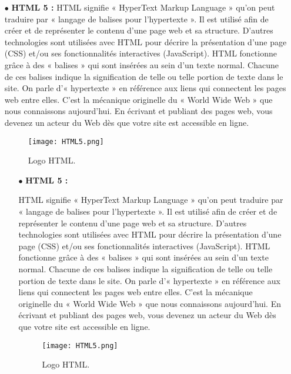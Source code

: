 \begin{itemize}
	\item[$\bullet$] \textbf{HTML 5 :} 	
HTML signifie « HyperText Markup Language » qu’on peut traduire par « langage de
balises pour l’hypertexte ». Il est utilisé afin de créer et de représenter le contenu d’une
page web et sa structure. D’autres technologies sont utilisées avec HTML pour décrire la
présentation d’une page (CSS) et/ou ses fonctionnalités interactives (JavaScript).
HTML fonctionne grâce à des « balises » qui sont insérées au sein d’un texte normal.
Chacune de ces balises indique la signification de telle ou telle portion de texte dans
le site. On parle d’« hypertexte » en référence aux liens qui connectent les pages web
entre elles. C’est la mécanique originelle du « World Wide Web » que nous connaissons
aujourd’hui. En écrivant et publiant des pages web, vous devenez un acteur du Web dès
que votre site est accessible en ligne.\cite{wiki:Hypertext_Markup_Language}
	\begin{figure}[ht]
		\centering
		\texttt{[image: HTML5.png]}
		\caption{Logo HTML.}
		\label{fig:HTML5 }
	\end{figure}
	\FloatBarrier	
	\medskip
	
	
	
	\begin{itemize}
		\item[$\bullet$] \textbf{HTML 5 :} 
		
		
		
		
		
		
		HTML signifie « HyperText Markup Language » qu’on peut traduire par « langage de
		balises pour l’hypertexte ». Il est utilisé afin de créer et de représenter le contenu d’une
		page web et sa structure. D’autres technologies sont utilisées avec HTML pour décrire la
		présentation d’une page (CSS) et/ou ses fonctionnalités interactives (JavaScript).
		HTML fonctionne grâce à des « balises » qui sont insérées au sein d’un texte normal.
		Chacune de ces balises indique la signification de telle ou telle portion de texte dans
		le site. On parle d’« hypertexte » en référence aux liens qui connectent les pages web
		entre elles. C’est la mécanique originelle du « World Wide Web » que nous connaissons
		aujourd’hui. En écrivant et publiant des pages web, vous devenez un acteur du Web dès
		que votre site est accessible en ligne.\cite{wiki:Hypertext_Markup_Language}
		\begin{figure}[ht]
			\centering
			\texttt{[image: HTML5.png]}
			\caption{Logo HTML.}
			\label{fig:HTML5 }
		\end{figure}
		\FloatBarrier
		

\end{itemize}
\end{itemize}
